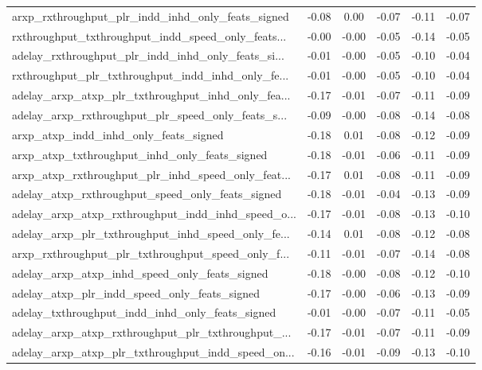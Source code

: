 \begin{tabular}{|l|*{4}{c}|r|}
arxp\_rxthroughput\_plr\_indd\_inhd\_only\_feats\_signed  & -0.08 &  0.00 &   -0.07 &      -0.11 & -0.07 \\
rxthroughput\_txthroughput\_indd\_speed\_only\_feats... & -0.00 & -0.00 &   -0.05 &      -0.14 & -0.05 \\
adelay\_rxthroughput\_plr\_indd\_inhd\_only\_feats\_si... & -0.01 & -0.00 &   -0.05 &      -0.10 & -0.04 \\
rxthroughput\_plr\_txthroughput\_indd\_inhd\_only\_fe... & -0.01 & -0.00 &   -0.05 &      -0.10 & -0.04 \\
adelay\_arxp\_atxp\_plr\_txthroughput\_inhd\_only\_fea... & -0.17 & -0.01 &   -0.07 &      -0.11 & -0.09 \\
adelay\_arxp\_rxthroughput\_plr\_speed\_only\_feats\_s... & -0.09 & -0.00 &   -0.08 &      -0.14 & -0.08 \\
arxp\_atxp\_indd\_inhd\_only\_feats\_signed              & -0.18 &  0.01 &   -0.08 &      -0.12 & -0.09 \\
arxp\_atxp\_txthroughput\_inhd\_only\_feats\_signed      & -0.18 & -0.01 &   -0.06 &      -0.11 & -0.09 \\
arxp\_atxp\_rxthroughput\_plr\_inhd\_speed\_only\_feat... & -0.17 &  0.01 &   -0.08 &      -0.11 & -0.09 \\
adelay\_atxp\_rxthroughput\_speed\_only\_feats\_signed   & -0.18 & -0.01 &   -0.04 &      -0.13 & -0.09 \\
adelay\_arxp\_atxp\_rxthroughput\_indd\_inhd\_speed\_o... & -0.17 & -0.01 &   -0.08 &      -0.13 & -0.10 \\
adelay\_arxp\_plr\_txthroughput\_inhd\_speed\_only\_fe... & -0.14 &  0.01 &   -0.08 &      -0.12 & -0.08 \\
arxp\_rxthroughput\_plr\_txthroughput\_speed\_only\_f... & -0.11 & -0.01 &   -0.07 &      -0.14 & -0.08 \\
adelay\_arxp\_atxp\_inhd\_speed\_only\_feats\_signed      & -0.18 & -0.00 &   -0.08 &      -0.12 & -0.10 \\
adelay\_atxp\_plr\_indd\_speed\_only\_feats\_signed       & -0.17 & -0.00 &   -0.06 &      -0.13 & -0.09 \\
adelay\_txthroughput\_indd\_inhd\_only\_feats\_signed    & -0.01 & -0.00 &   -0.07 &      -0.11 & -0.05 \\
adelay\_arxp\_atxp\_rxthroughput\_plr\_txthroughput\_... & -0.17 & -0.01 &   -0.07 &      -0.11 & -0.09 \\
adelay\_arxp\_atxp\_plr\_txthroughput\_indd\_speed\_on... & -0.16 & -0.01 &   -0.09 &      -0.13 & -0.10 \\

\end{tabular}
